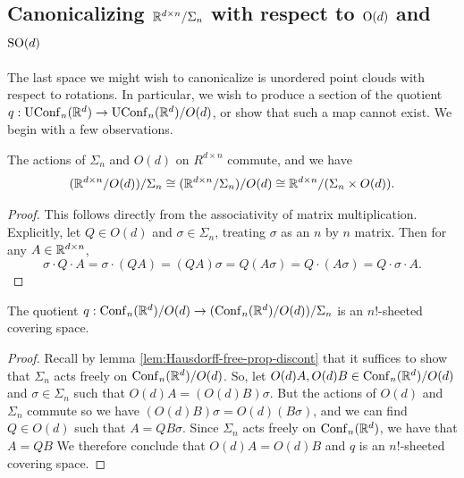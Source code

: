 \subsection{Canonicalizing $\mathbb{R}^{d \times n}/\Sigma_n$ with respect to $\operatorname{O}(d)$ and $\operatorname{SO}(d)$}\label{sec:canonicalizing-point-clouds-rotations}
The last space we might wish to canonicalize is unordered point clouds with respect to rotations.
In particular, we wish to produce a section of the quotient $q : \operatorname{UConf}_n(\mathbb{R}^d) \to \operatorname{UConf}_n(\mathbb{R}^d) / O(d)$, or show that such a map cannot exist.
We begin with a few observations.

\begin{lemma}\label{lem:Od-Sigman-commute}
    The actions of $\Sigma_n$ and $O(d)$ on $R^{d \times n}$ commute, and we have
    \[
        (\mathbb{R}^{d \times n} / O(d)) / \Sigma_n
        \cong (\mathbb{R}^{d \times n} / \Sigma_n) / O(d)
        \cong \mathbb{R}^{d \times n} / (\Sigma_n \times O(d)).
    \]
    \begin{proof}
        This follows directly from the associativity of matrix multiplication.
        Explicitly, let $Q \in O(d)$ and $\sigma \in \Sigma_n$, treating $\sigma$ as an $n$ by $n$ matrix.
        Then for any $A \in \mathbb{R}^{d \times n}$,
        \[
            \sigma \cdot Q \cdot A
            = \sigma \cdot (QA)
            = (QA)\sigma
            = Q(A\sigma)
            = Q \cdot (A \sigma)
            = Q \cdot \sigma \cdot A.
        \]
    \end{proof}
\end{lemma}

\begin{lemma}\label{lem:Conf-mod-orthogonal-mod-permutation-covering}
    The quotient $q : \operatorname{Conf}_n(\mathbb{R}^d)/O(d) \to (\operatorname{Conf}_n(\mathbb{R}^d)/O(d))/\Sigma_n$ is an $n!$-sheeted covering space.
    \begin{proof}
        Recall by lemma \ref{lem:Hausdorff-free-prop-discont} that it suffices to show that $\Sigma_n$ acts freely on $\operatorname{Conf}_n(\mathbb{R}^d)/O(d)$.
        So, let $O(d)A, O(d)B \in \operatorname{Conf}_n(\mathbb{R}^d)/O(d)$ and $\sigma \in \Sigma_n$ such that $O(d)A = (O(d)B)\sigma$.
        But the actions of $O(d)$ and $\Sigma_n$ commute so we have $(O(d)B)\sigma = O(d)(B\sigma)$, and we can find $Q \in O(d)$ such that $A = QB\sigma$.
        Since $\Sigma_n$ acts freely on $\operatorname{Conf}_n(\mathbb{R}^d)$, we have that $A = QB$
        We therefore conclude that $O(d)A = O(d)B$ and $q$ is an $n!$-sheeted covering space.
    \end{proof}
\end{lemma}

